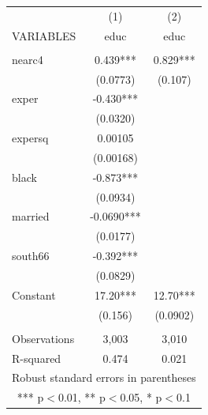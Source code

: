 \documentclass[]{article}
\begin{document}
\begin{tabular}{lcc} \hline
 & (1) & (2) \\
VARIABLES & educ & educ \\ \hline
 &  &  \\
nearc4 & 0.439*** & 0.829*** \\
 & (0.0773) & (0.107) \\
exper & -0.430*** &  \\
 & (0.0320) &  \\
expersq & 0.00105 &  \\
 & (0.00168) &  \\
black & -0.873*** &  \\
 & (0.0934) &  \\
married & -0.0690*** &  \\
 & (0.0177) &  \\
south66 & -0.392*** &  \\
 & (0.0829) &  \\
Constant & 17.20*** & 12.70*** \\
 & (0.156) & (0.0902) \\
 &  &  \\
Observations & 3,003 & 3,010 \\
 R-squared & 0.474 & 0.021 \\ \hline
\multicolumn{3}{c}{ Robust standard errors in parentheses} \\
\multicolumn{3}{c}{ *** p$<$0.01, ** p$<$0.05, * p$<$0.1} \\
\end{tabular}
\end{document}

